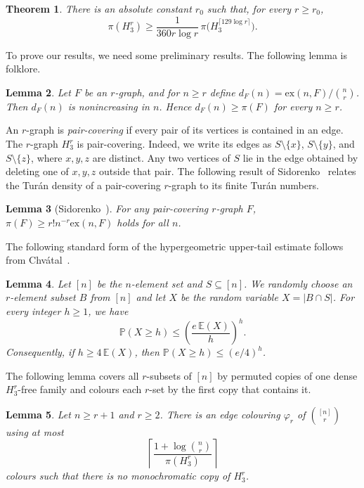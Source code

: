 \documentclass[12pt,a4paper]{article}
\numberwithin{equation}{section}
\newtheorem{theorem}{Theorem}[section]
\newtheorem{lemma}[theorem]{Lemma}
\theoremstyle{definition}
\theoremstyle{remark}
\begin{document}
\begin{theorem}\label{end:thm:recursion}
There is an absolute constant $r_0$ such that, for every $r\ge r_0$,
$$\pi(H_3^r)\ge \frac{1}{360r\log r}\,\pi\bigl(H_3^{\lceil 129\log r\rceil}\bigr).$$
\end{theorem}

To prove our results, we need some preliminary results. The following lemma is folklore. 

\begin{lemma}\label{end:lem:finite-density}
Let $F$ be an $r$-graph, and for $n\ge r$ define $d_F(n)=\mathrm{ex}(n,F)/\binom nr$.
Then $d_F(n)$ is nonincreasing in $n$.
Hence $d_F(n)\ge \pi(F)$ for every $n\ge r$.
\end{lemma}


An $r$-graph is \emph{pair-covering} if every pair of its vertices is contained in an edge.  
The $r$-graph $H_3^r$ is pair-covering.  
Indeed, we write its edges as $S\setminus\{x\}$, $S\setminus\{y\}$, and $S\setminus\{z\}$, where $x,y,z$ are distinct.  
Any two vertices of $S$ lie in the edge obtained by deleting one of $x,y,z$ outside that pair. The following result of Sidorenko~\cite{Sidorenko2024} relates the Tur\'an density of a pair-covering $r$-graph to its finite Tur\'an numbers.
\begin{lemma}[Sidorenko~\cite{Sidorenko2024}]\label{end:lem:blowup}
For any pair-covering $r$-graph $F$, 
$\pi(F)\ge r!n^{-r}\mathrm{ex}(n,F)$ holds for all $n$.
\end{lemma}


The following standard form of the hypergeometric upper-tail estimate follows from Chv\'atal~\cite{Chvatal1979}.

\begin{lemma}\label{end:lem:hypergeom}
Let $[n]$ be the $n$-element set and $S\subseteq [n]$.  We randomly choose an $r$-element subset $B$ from $[n]$ and let $X$ be the random variable $X=|B\cap S|$.
For every integer $h\ge1$, we have
$$\mathbb{P}(X\ge h)\le \left(\frac{e \,\mathbb{E}(X)}{h}\right)^h.$$
Consequently, if $h\ge4 \,\mathbb{E}(X)$, then $\mathbb{P}(X\ge h)\le(e/4)^h$.
\end{lemma}



The following lemma covers all $r$-subsets of $[n]$ by permuted copies of one dense $H_3^r$-free 
family and colours each $r$-set by the first copy that contains it.

\begin{lemma}\label{end:lem:local-colour}
Let $n\ge r+1$ and $r\ge2$.  There is an edge colouring $\varphi_r$ of
$\binom{[n]}{r}$ using at most
$$ \left\lceil\frac{1+\log\binom nr}{\pi(H_3^r)}\right\rceil$$
colours such that there is no monochromatic copy of $H_3^r$.


\end{lemma}
\end{document}
